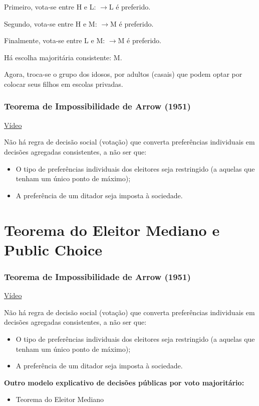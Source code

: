 \documentclass[a4paper,12pt]{article}[abntex2]
\begin{document}
Primeiro, vota-se entre H e L: \(\rightarrow\)L é preferido.

Segundo, vota-se entre H e M: \(\rightarrow\)M é preferido.

Finalmente, vota-se entre L e M: \(\rightarrow\)M é preferido.

Há escolha majoritária consistente: M.

Agora, troca-se o grupo dos idosos, por adultos (casais) que podem optar por colocar seus filhos em escolas privadas. 

\subsubsection{\textbf{Teorema de Impossibilidade de Arrow (1951)}}
\href{https://www.youtube.com/watch?v=849u239O5yo}{Vídeo}

Não há regra de decisão social (votação) que converta preferências individuais em decisões agregadas consistentes, a não ser que:\begin{itemize}
    \item O tipo de preferências individuais dos eleitores seja restringido (a aquelas que tenham um único ponto de máximo);
    \item A preferência de um ditador seja imposta à sociedade. 
\end{itemize}

\newpage
\section{\textbf{Teorema do Eleitor Mediano e Public Choice}}
\subsubsection{\textbf{Teorema de Impossibilidade de Arrow (1951)}}
\href{https://www.youtube.com/watch?v=849u239O5yo}{Vídeo}

Não há regra de decisão social (votação) que converta preferências individuais em decisões agregadas consistentes, a não ser que:\begin{itemize}
    \item O tipo de preferências individuais dos eleitores seja restringido (a aquelas que tenham um único ponto de máximo);
    \item A preferência de um ditador seja imposta à sociedade. 
\end{itemize}

\textbf{Outro modelo explicativo de decisões públicas por voto majoritário:}\begin{itemize}
    \item Teorema do Eleitor Mediano
\end{itemize}
\end{document}

